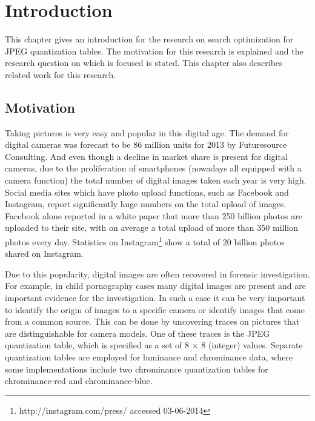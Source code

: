 
\chapter{Introduction} %

\label{ch:name} %

This chapter gives an introduction for the research on search optimization for JPEG quantization tables. The motivation for this research is explained and the research question on which is focused is stated. This chapter also describes related work for this research.

\section{Motivation}

Taking pictures is very easy and popular in this digital age. The demand for digital cameras was forecast to be 86 million units for 2013 by Futuresource Consulting\cite{futuresource}. And even though a decline in market share is present for digital cameras, due to the  proliferation of smartphones (nowadays all equipped with a camera function) the total number of digital images taken each year is very high. Social media sites which have photo upload functions, such as Facebook and Instagram, report significantly huge numbers on the total upload of images. Facebook alone reported in a white paper \cite{whitefacebook} that more than 250 billion photos are uploaded to their site, with on average a total upload of more than 350 million photos every day. Statistics on Instagram\footnote{http://instagram.com/press/ accessed 03-06-2014} show a total of 20 billion photos shared on Instagram.

Due to this popularity, digital images are often recovered in forensic investigation. For example, in child pornography cases many digital images are present and are important evidence for the investigation. In such a case it can be very important to identify the origin of images to a specific camera or identify images that come from a common source. This can be done by uncovering traces on pictures that are distinguishable for camera models. One of these traces is the JPEG quantization table, which is specified as a set of 8 $\times$ 8 (integer) values. Separate quantization tables are employed for luminance and chrominance data, where some implementations include two chrominance quantization tables for chrominance-red and chrominance-blue. 

